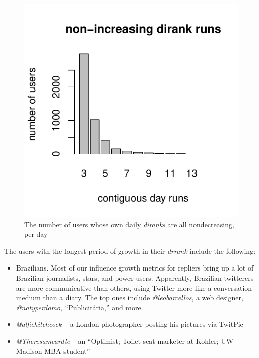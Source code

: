 \documentclass[10pt,oneside]{memoir}
\begin{document}
\begin{Spacing}{2}
\begin{figure}
\begin{center}
    \includegraphics{figures/irr-hist}
    \caption{The number of users whose own daily \emph{diranks} are all nondecreasing, per day}
    \label{figure:irr-hist}
\end{center}
\end{figure}
The users with the longest period of growth in their {\itshape drrank} include the following:


\begin{itemize}


\item Brazilians.  Most of our influence growth metrics for repliers bring up a lot of Brazilian journalists, stars, and power users.  Apparently, Brazilian twitterers are more communicative than others, using Twitter more like a conversation medium than a diary.  The top ones include {\itshape @leobarcellos}, a web designer, {\itshape @natyperdomo}, ``Publicitária,'' and more.

\item {\itshape @alfiehitchcock} -- a London photographer posting his pictures via TwitPic

\item {\itshape @Theresamcardle} -- an ``Optimist; Toilet seat marketer at Kohler; UW-Madison MBA student''
\end{itemize}


\end{Spacing}
\end{document}
